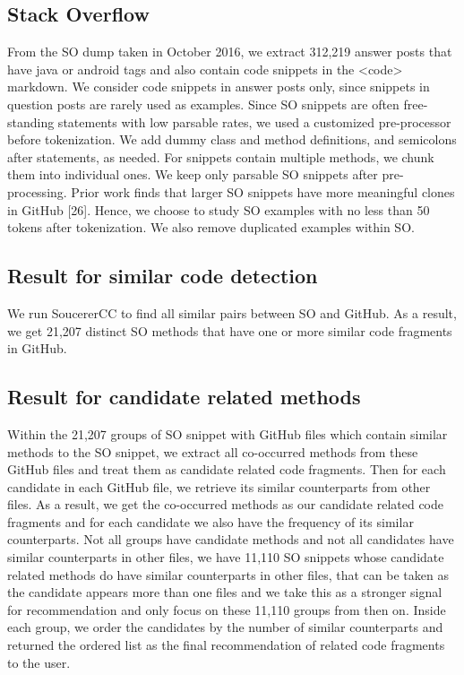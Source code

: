 \subsection{Stack Overflow}
From the SO dump taken in October 2016, we extract 312,219 answer posts that have java or android tags and also contain code snippets in the {\ttt <code>} markdown. We consider code snippets in answer posts only, since snippets in question posts are rarely used as examples. Since SO snippets are often free-standing statements with low parsable rates, we used a customized pre-processor before tokenization. We add dummy class and method definitions, and semicolons after statements, as needed. For snippets contain multiple methods, we chunk them into individual ones. We keep only parsable SO snippets after pre-processing. Prior work finds that larger SO snippets have more meaningful clones in GitHub [26]. Hence, we choose to study SO examples with no less than 50 tokens after tokenization. We also remove duplicated examples within SO.

\subsection{Result for similar code detection}
We run SoucererCC to find all similar pairs between SO and GitHub. As a result, we get 21,207 distinct SO methods that have one or more similar code fragments in GitHub. 

\subsection{Result for candidate related methods}
Within the 21,207 groups of SO snippet with GitHub files which contain similar methods to the SO snippet, we extract all co-occurred methods from these GitHub files and treat them as candidate related code fragments. Then for each candidate in each GitHub file, we retrieve its similar counterparts from other files. As a result, we get the co-occurred methods as our candidate related code fragments and for each candidate we also have the frequency of its similar counterparts. Not all groups have candidate methods and not all candidates have similar counterparts in other files, we have 11,110 SO snippets whose candidate related methods do have similar counterparts in other files, that can be taken as the candidate appears more than one files and we take this as a stronger signal for recommendation and only focus on these 11,110 groups from then on. Inside each group, we order the candidates by the number of similar counterparts and returned the ordered list as the final recommendation of related code fragments to the user. 

